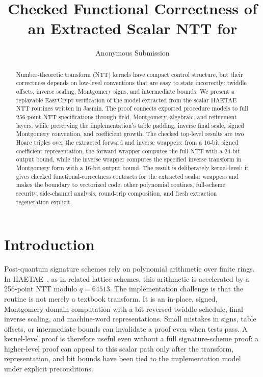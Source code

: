 \documentclass[10pt,twocolumn]{article}
\title{\vspace{-0.8em}Checked Functional Correctness of an Extracted \jasmin{} Scalar NTT for \haetae{}}
\author{Anonymous Submission}
\date{}
\newcommand{\haetae}{HAETAE}
\newcommand{\ec}{EasyCrypt}
\newcommand{\jasmin}{Jasmin}
\begin{document}
\maketitle
\vspace{-1.1em}

\begin{abstract}
Number-theoretic transform (NTT) kernels have compact control structure, but
their correctness depends on low-level conventions that are easy to state
incorrectly: twiddle offsets, inverse scaling, Montgomery signs, and
intermediate bounds. We present a replayable \ec{} verification of the model
extracted from the scalar \haetae{} NTT routines written in \jasmin{}. The proof
connects exported procedure models to full 256-point NTT specifications through
field, Montgomery, algebraic, and refinement layers, while preserving the
implementation's table padding, inverse final scale, signed Montgomery
convention, and coefficient growth. The checked top-level results are two Hoare
triples over the extracted forward and inverse wrappers: from a 16-bit signed
coefficient representation, the forward wrapper computes the full NTT with a
24-bit output bound, while the inverse wrapper computes the specified inverse
transform in Montgomery form with a 16-bit output bound. The result is
deliberately kernel-level: it gives checked functional-correctness contracts for
the extracted scalar wrappers and makes the boundary to vectorized code, other
polynomial routines, full-scheme security, side-channel analysis, round-trip
composition, and fresh extraction regeneration explicit.
\end{abstract}

\section{Introduction}

Post-quantum signature schemes rely on polynomial arithmetic over finite rings.
In \haetae{}~\cite{HAETAE2022}, as in related lattice schemes, this arithmetic is
accelerated by a 256-point NTT modulo \(q=64513\). The implementation challenge
is that the routine is not merely a textbook transform. It is an in-place,
signed, Montgomery-domain computation with a bit-reversed twiddle schedule,
final inverse scaling, and machine-word representations. Small mistakes in
signs, table offsets, or intermediate bounds can invalidate a proof even when
tests pass. A kernel-level proof is therefore useful even without a full
signature-scheme proof: a higher-level proof can appeal to this scalar path only
after the transform, representation, and bit bounds have been tied to the
implementation model under explicit preconditions.
\end{document}

